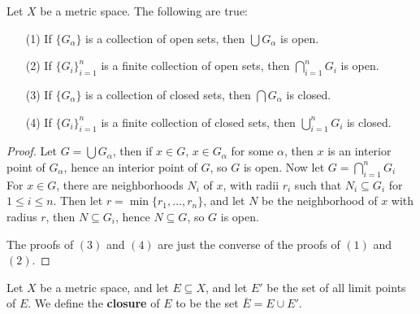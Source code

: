 \begin{theorem}\label{theorem_2.2.6}
  Let $X$ be a metric space. The following are true:
  \begin{enumerate}
    \item[(1)] If $\{G_{\alpha}\}$ is a collection of  open sets, then
      $\bigcup{G_{\alpha}}$ is open.

    \item[(2)] If $\{G_i\}_{i=1}^n$ is a finite collection of open sets, then
      $\bigcap_{i=1}^{n}{G_i}$ is open.

    \item[(3)] If $\{G_{\alpha}\}$ is a collection of  closed sets, then
      $\bigcap{G_{\alpha}}$ is closed.

    \item[(4)] If $\{G_i\}_{i=1}^n$ is a finite collection of closed sets, then
      $\bigcup_{i=1}^{n}{G_i}$ is closed.
  \end{enumerate}
\end{theorem}
\begin{proof}
  Let $G=\bigcup{G_{\alpha}}$, then if $x \in G$,  $x \in G_{\alpha}$ for some
  $\alpha$, then $x$ is an interior point of  $G_{\alpha}$, hence an interior
  point of  $G$, so $G$ is open. Now let  $G=\bigcap_{i=1}^{n}{G_i}$ For  $x \in
  G$, there are neighborhoods  $N_i$ of  $x$, with radii  $r_i$ such that  $N_i
  \subseteq G_i$ for  $1 \leq i \leq n$. Then let  $r=\min\{r_1, \dots, r_n\}$,
  and let $N$ be the neighborhood of  $x$ with radius  $r$, then  $N \subseteq G_i$,
  hence  $N \subseteq G$, so  $G$ is open.

  The proofs of  $(3)$ and  $(4)$ are just the converse of the proofs of  $(1)$
  and  $(2)$.
\end{proof}

\begin{definition}
  Let $X$ be a metric space, and let  $E \subseteq X$, and let  $E'$ be the set
  of all limit points of $E$. We define the \textbf{closure} of $E$ to be the
  set $\bar{E}=E \cup E'$.
\end{definition}

